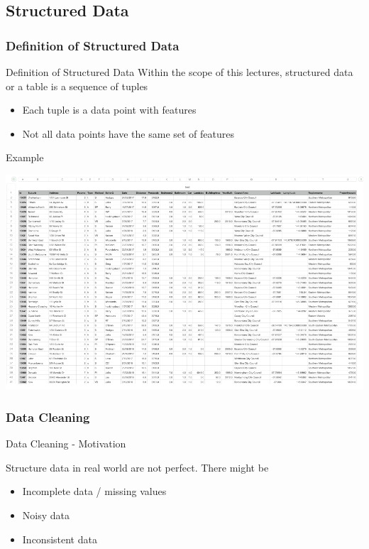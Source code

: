\subsection{Structured Data}

\subsubsection{Definition of Structured Data}
\begin{frame}{Definition of Structured Data}
Within the scope of this lectures, structured data or a table is a sequence of tuples
\begin{itemize}
    \item Each tuple is a data point with features
    \item Not all data points have the same set of features
\end{itemize}

\end{frame}

\begin{frame}{Example}
    \begin{center}
    \includegraphics[width=\textwidth]{assets/defintion_structured_data.png}
    \end{center}
\end{frame}

\subsubsection{Data Cleaning}

\begin{frame}{Data Cleaning - Motivation}

Structure data in real world are not perfect. There might be

\begin{itemize}
    \item Incomplete data / missing values
    \item Noisy data
    \item Inconsistent data
\end{itemize}

\end{frame}

